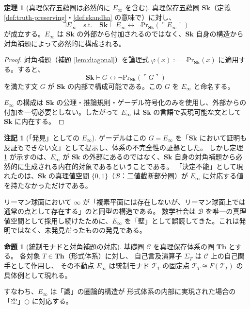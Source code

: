 \documentclass[11pt,a4paper]{article}
\theoremstyle{definition}
\newtheorem{theorem}{定理}[section]
\newtheorem{proposition}{命題}[section]
\newtheorem{remark}{注記}[section]
\newcommand{\Sk}{\mathbf{Sk}}
\newcommand{\T}{\mathcal{T}}
\newcommand{\PrSk}{\mathrm{Pr}_{\Sk}}
\newcommand{\Einf}{E_{\infty}}
\begin{document}
\begin{theorem}[真理保存五蘊圏は必然的に $\Einf$ を含む]\label{thm:e-infinity-existence}
真理保存五蘊圏 $\Sk$（定義 \ref{def:truth-preserving}・\ref{def:skandha} の意味で）に対し、
\begin{equation}
\exists \Einf \quad \text{s.t.} \quad 
\Sk \vdash \Einf \leftrightarrow \neg\PrSk(\ulcorner \Einf \urcorner)
\end{equation}
が成立する。$\Einf$ は $\Sk$ の外部から付加されるのではなく、$\Sk$ 自身の構造から対角補題によって必然的に構成される。
\end{theorem}
\begin{proof}
対角補題（補題 \ref{lem:diagonal}）を論理式 $\varphi(x) := \neg\PrSk(x)$ に適用する。すると、
\begin{equation}
\Sk \vdash G \leftrightarrow \neg\PrSk(\ulcorner G \urcorner)
\end{equation}
を満たす文 $G$ が $\Sk$ の内部で構成可能である。この $G$ を $\Einf$ と命名する。

$\Einf$ の構成は $\Sk$ の公理・推論規則・ゲーデル符号化のみを使用し、外部からの付加を一切必要としない。したがって $\Einf$ は $\Sk$ の言語で表現可能な文として $\Sk$ に内在する。
\end{proof}

\begin{remark}[「発見」としての $\Einf$]\label{rem:e-infinity-discovery}
ゲーデルはこの $G = \Einf$ を「$\Sk$ において証明も反証もできない文」として提示し、体系の不完全性の証拠とした。
しかし定理 \ref{thm:e-infinity-existence} が示すのは、$\Einf$ が $\Sk$ の外部にあるのではなく、$\Sk$ 自身の対角補題から必然的に生成される内在的対象であるということである。
「決定不能」として現れたのは、$\Sk$ の真理値空間 $\{0,1\}$（$\mathcal{B}$：二値截断部分圏）が $\Einf$ に対応する値を持たなかっただけである。

リーマン球面において $\infty$ が「複素平面には存在しないが、リーマン球面上では通常の点として存在する」のと同型の構造である。
数学社会は $\mathcal{B}$ を唯一の真理値空間として採用し続けたために、$\Einf$ を「壁」として誤読してきた。これは発明ではなく、未発見だったものの発見である。
\end{remark}

\begin{proposition}[統制モナドと対角補題の対応]\label{prop:monad-diagonal}
基礎圏 $\mathcal{C}$ を真理保存体系の圏 $\mathbf{Th}$ とする。
各対象 $T \in \mathbf{Th}$（形式体系）に対し、
自己言及演算子 $\Sigma_T$ は $\mathcal{C}$ 上の自己関手として作用し、
その不動点 $\Einf$ は統制モナド $\T_T$ の固定点
$\T_T \cong F(\T_T)$ の具体例として現れる。

すなわち、$\Einf$ は「識」の圏論的構造が
形式体系の内部に実現された場合の「空」$\bigcirc$ に対応する。
\end{proposition}
\end{document}
